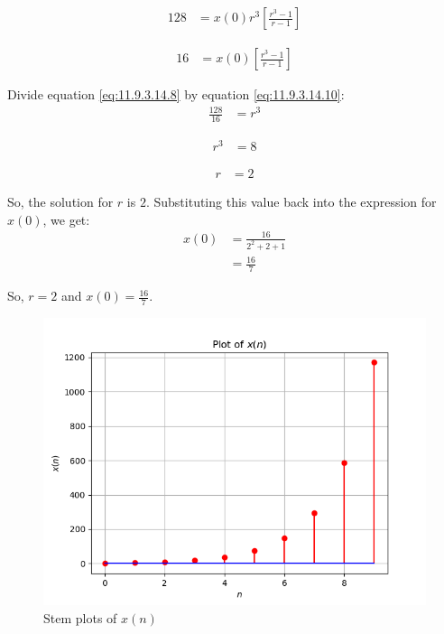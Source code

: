 \documentclass[journal,12pt,onecolumn]{IEEEtran}
\theoremstyle{remark}
\begin{document}
\begin{align}
128 &= x(0)r^3\left[\frac{r^3 - 1}{r - 1}\right] \label{eq:11.9.3.14.9}
\end{align}

\begin{align}
16 &= x(0)\left[\frac{r^3 - 1}{r - 1}\right] \label{eq:11.9.3.14.10}
\end{align}

Divide equation \eqref{eq:11.9.3.14.8} by equation \eqref{eq:11.9.3.14.10}:
\begin{align}
\frac{128}{16} &= r^3 \label{eq:11.9.3.14.11}
\end{align}

\begin{align}
r^3 &= 8 \label{eq:11.9.3.14.12}
\end{align}

\begin{align}
r &= 2 \label{eq:11.9.3.14.13}
\end{align}

So, the solution for $r$ is $2$. Substituting this value back into the expression for $x(0)$, we get:
\begin{align}
x(0) &= \frac{16}{2^2 + 2 + 1} \label{eq:11.9.3.14.14} \\
&= \frac{16}{7} \label{eq:11.9.3.14.16}
\end{align}

So, $r = 2$ and $x(0) = \frac{16}{7}$.
\begin{figure}[h!]
    \centering
    \includegraphics[width=\columnwidth]{figs/plotx.png}
    \caption{Stem plots of $x(n)$}
    \label{fig:11.9.3.14.1}
\end{figure}
\end{document}
